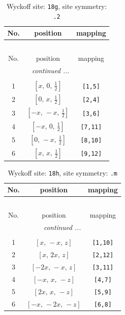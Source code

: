 \documentclass[fleqn,8pt]{jsarticle}
\begin{document}
\renewcommand{\arraystretch}{1.2}
\begin{longtable}{ccc}
\caption{Wyckoff site: {\tt 18g}, site symmetry: {\tt .2}}
 \\
 \hline \hline
No. & position & mapping \\ \hline \endfirsthead

\multicolumn{2}{l}{\tablename\ \thetable{}} \\
 \hline \hline
No. & position & mapping \\ \hline \endhead

 \hline \hline
\multicolumn{2}{r}{\footnotesize\it continued ...} \\ \endfoot

 \hline \hline
\multicolumn{2}{r}{} \\ \endlastfoot

1 & $\left[ x,\, 0,\, \frac{1}{2} \right]$ & {\tt [1,5]} \\ \hline
2 & $\left[ 0,\, x,\, \frac{1}{2} \right]$ & {\tt [2,4]} \\ \hline
3 & $\left[ - x,\, - x,\, \frac{1}{2} \right]$ & {\tt [3,6]} \\ \hline
4 & $\left[ - x,\, 0,\, \frac{1}{2} \right]$ & {\tt [7,11]} \\ \hline
5 & $\left[ 0,\, - x,\, \frac{1}{2} \right]$ & {\tt [8,10]} \\ \hline
6 & $\left[ x,\, x,\, \frac{1}{2} \right]$ & {\tt [9,12]} \\
\end{longtable}
\renewcommand{\arraystretch}{1.2}
\begin{longtable}{ccc}
\caption{Wyckoff site: {\tt 18h}, site symmetry: {\tt .m}}
 \\
 \hline \hline
No. & position & mapping \\ \hline \endfirsthead

\multicolumn{2}{l}{\tablename\ \thetable{}} \\
 \hline \hline
No. & position & mapping \\ \hline \endhead

 \hline \hline
\multicolumn{2}{r}{\footnotesize\it continued ...} \\ \endfoot

 \hline \hline
\multicolumn{2}{r}{} \\ \endlastfoot

1 & $\left[ x,\, - x,\, z \right]$ & {\tt [1,10]} \\ \hline
2 & $\left[ x,\, 2 x,\, z \right]$ & {\tt [2,12]} \\ \hline
3 & $\left[ - 2 x,\, - x,\, z \right]$ & {\tt [3,11]} \\ \hline
4 & $\left[ - x,\, x,\, - z \right]$ & {\tt [4,7]} \\ \hline
5 & $\left[ 2 x,\, x,\, - z \right]$ & {\tt [5,9]} \\ \hline
6 & $\left[ - x,\, - 2 x,\, - z \right]$ & {\tt [6,8]} \\
\end{longtable}
\end{document}
